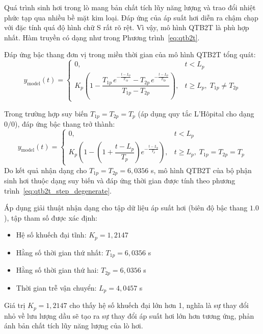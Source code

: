 \documentclass[../main.tex]{subfiles}
\begin{document}
Quá trình sinh hơi trong lò mang bản chất tích lũy năng lượng và trao đổi nhiệt phức tạp qua nhiều bề mặt kim loại. Đáp ứng của áp suất hơi diễn ra chậm chạp với đặc tính quá độ hình chữ S rất rõ rệt. Vì vậy, mô hình QTB2T là phù hợp nhất. Hàm truyền có dạng như trong Phương trình~\ref{eq:qtb2t}.

Đáp ứng bậc thang đơn vị trong miền thời gian của mô hình QTB2T tổng quát:
\begin{equation}
    y_{\mathrm{model}}(t) =
    \begin{cases}
        0, & t < L_p \\[4pt]
        K_p\!\left(1 - \dfrac{T_{1p}\,e^{-\frac{t - L_p}{T_{1p}}} - T_{2p}\,e^{-\frac{t - L_p}{T_{2p}}}}{T_{1p} - T_{2p}}\right), & t \geq L_p,\; T_{1p} \neq T_{2p}
    \end{cases}
    \label{eq:qtb2t_step}
\end{equation}

Trong trường hợp suy biến $T_{1p} = T_{2p} = T_p$ (áp dụng quy tắc L'Hôpital cho dạng $0/0$), đáp ứng bậc thang trở thành:
\begin{equation}
    y_{\mathrm{model}}(t) =
    \begin{cases}
        0, & t < L_p \\[4pt]
        K_p\!\left(1 - \left(1 + \dfrac{t - L_p}{T_p}\right) e^{-\frac{t - L_p}{T_p}}\right), & t \geq L_p,\; T_{1p} = T_{2p} = T_p
    \end{cases}
    \label{eq:qtb2t_step_degenerate}
\end{equation}
Do kết quả nhận dạng cho $T_{1p} = T_{2p} = 6{,}0356$ s, mô hình QTB2T của bộ phận sinh hơi thuộc dạng suy biến và đáp ứng thời gian được tính theo phương trình~\ref{eq:qtb2t_step_degenerate}.

Áp dụng giải thuật nhận dạng cho tập dữ liệu áp suất hơi (biên độ bậc thang $1.0$), tập tham số được xác định:

\begin{itemize}
    \item Hệ số khuếch đại tĩnh: $K_p = 1{,}2147$
    \item Hằng số thời gian thứ nhất: $T_{1p} = 6{,}0356$ s
    \item Hằng số thời gian thứ hai: $T_{2p} = 6{,}0356$ s
    \item Thời gian trễ vận chuyển: $L_p = 4{,}0457$ s
\end{itemize}

Giá trị $K_p = 1{,}2147$ cho thấy hệ số khuếch đại lớn hơn 1, nghĩa là sự thay đổi nhỏ về lưu lượng dầu sẽ tạo ra sự thay đổi áp suất hơi lớn hơn tương ứng, phản ánh bản chất tích lũy năng lượng của lò hơi.
\end{document}
